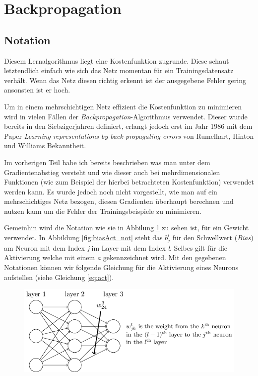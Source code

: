 \section{Backpropagation}

\subsection{Notation}
Diesem Lernalgorithmus liegt eine Kostenfunktion zugrunde. Diese schaut letztendlich einfach wie sich das Netz momentan für ein Trainingsdatensatz verhält. Wenn das Netz diesen richtig erkennt ist der ausgegebene Fehler gering ansonsten ist er hoch. 

Um in einem mehrschichtigen Netz effizient die Kostenfunktion zu minimieren wird in vielen Fällen der \emph{Backpropagation}-Algorithmus verwendet. Dieser wurde bereits in den Siebzigerjahren definiert, erlangt jedoch erst im Jahr 1986 mit dem Paper \emph{Learning representations by back-propagating errors} von Rumelhart, Hinton und Williams Bekanntheit. 

Im vorherigen Teil habe ich bereits beschrieben was man unter dem Gradientenabstieg versteht und wie dieser auch bei mehrdimensionalen Funktionen (wie zum Beispiel der hierbei betrachteten Kostenfunktion) verwendet werden kann. Es wurde jedoch noch nicht vorgestellt, wie man auf ein mehrschichtiges Netz bezogen, diesen Gradienten überhaupt berechnen und nutzen kann um die Fehler der Trainingsbeispiele zu minimieren. 

Gemeinhin wird die Notation wie sie in Abbilung \ref{fig:weight_not} zu sehen ist, für ein Gewicht verwendet. In Abbildung \ref{fig:biasAct_not} steht das $b^l_j$ für den Schwellwert (\emph{Bias}) am Neuron mit dem Index \emph{j} im Layer mit dem Index \emph{l}. Selbes gilt für die Aktivierung welche mit einem \emph{a} gekennzeichnet wird. Mit den gegebenen Notationen können wir folgende Gleichung für die Aktivierung eines Neurons aufstellen (siehe Gleichung \ref{eq:act}). 

\begin{figure}[!htb]
	\centering
	\includegraphics[width=.9\linewidth]{img/weight_notation}
	\label{fig:weight_not}
\end{figure}

